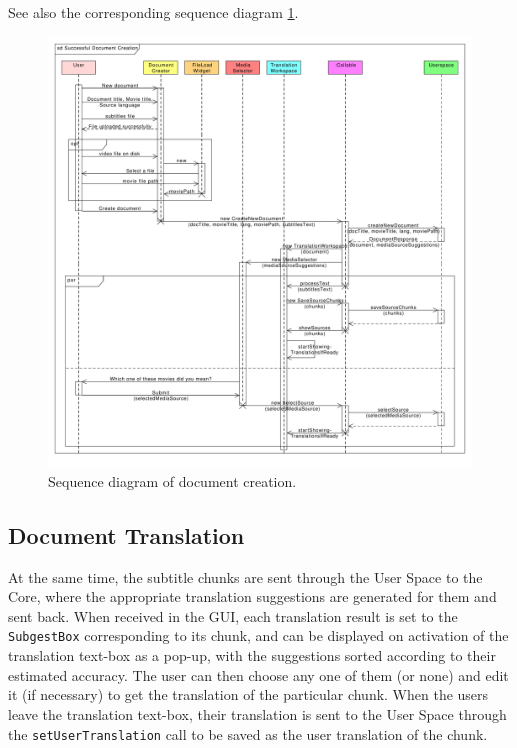 See also the corresponding sequence diagram \ref{gui:sd:document_creation}.

\begin{figure}[h]
\begin{center}
\includegraphics[scale=0.40]{figures/document_creation_sequence_GUI.pdf}
\end{center}
\caption{Sequence diagram of document creation.}\label{gui:sd:document_creation}
\end{figure}

\subsection{Document Translation}
\label{sec:document_translation}

At the same time, the subtitle chunks are sent through the User Space to the Core, where the appropriate translation suggestions are generated for them and sent back. When received in the GUI, each translation result is set to the {\tt SubgestBox} corresponding to its chunk, and can be displayed on activation of the translation text-box as a pop-up, with the suggestions sorted according to their estimated accuracy.
The user can then choose any one of them (or none) and edit it (if necessary) to get the translation of the particular chunk. When the users leave the translation text-box, their translation is sent to the User Space through the {\tt setUserTranslation} call to be saved as the user translation of the chunk.

